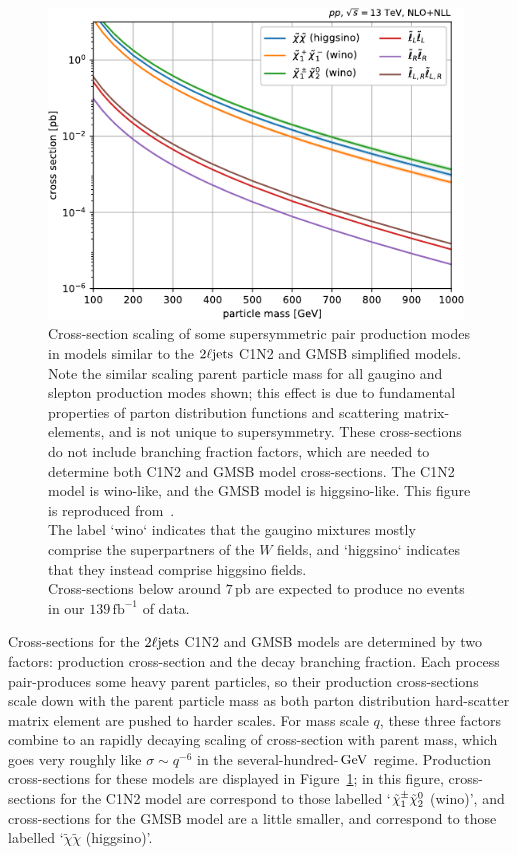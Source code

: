 \begin{figure}[tp]
\centering
\includegraphics[width=0.98\textwidth]{figures/theory_pdg_susy_xsec.pdf}
\caption[
Cross-section scaling of some supersymmetric pair production modes
]{%
Cross-section scaling of some supersymmetric pair production modes
in models similar to the $\twoljets$ C1N2 and GMSB simplified models.
Note the similar scaling parent particle mass  for all gaugino and slepton
production modes shown;
this effect is due to fundamental properties of parton distribution functions
and scattering matrix-elements, and is not unique to supersymmetry.
These cross-sections do not include branching fraction factors, which are
needed to determine both C1N2 and GMSB model cross-sections.
The C1N2 model is wino-like, and the GMSB model is higgsino-like.
This figure is reproduced from~\cite{pdg2022ynf}.
\\[0.4em]
The label `wino` indicates that the gaugino mixtures mostly comprise the
superpartners of the $W$ fields, and `higgsino` indicates that they instead
comprise higgsino fields.
\\[0.4em]
Cross-sections below around $7\,\mathrm{pb}$ are expected to produce no
events in our $139\,\mathrm{fb}^{-1}$ of data.
}
\label{fig:theory_susy_xs}
\end{figure}

Cross-sections for the $\twoljets$ C1N2 and GMSB models are determined by two
factors: production cross-section and the decay branching fraction.
Each process pair-produces some heavy parent particles, so their production
cross-sections scale down with the parent particle mass
as both parton distribution hard-scatter matrix element
are pushed to harder scales.
For mass scale $q$, these three factors combine to an rapidly decaying scaling
of cross-section with parent mass, which goes very roughly like
$\sigma \sim q^{-6}$ in the several-hundred-$\,\eV[G]$ regime.
Production cross-sections for these models are displayed in
Figure~\ref{fig:theory_susy_xs};
in this figure,
cross-sections for the C1N2 model are correspond to those labelled
`$\chargino_1 \neutralino_2$ (wino)', and
cross-sections for the GMSB model are a little smaller, and correspond to those
labelled `$\tilde \chi \tilde \chi$ (higgsino)'.

